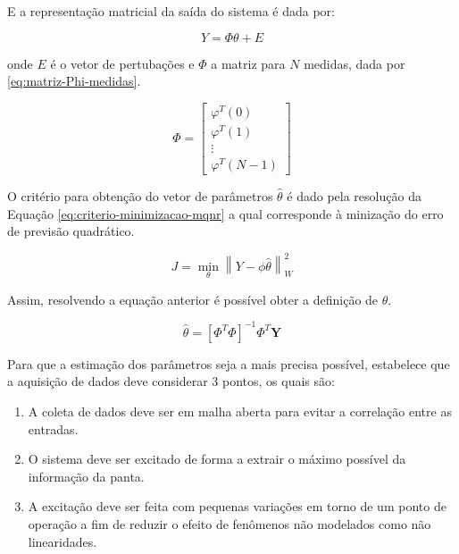 			E a representação matricial da saída do sistema é dada por:

			\begin{equation}
				\label{eq:vetor-y-medidas}
				Y = \Phi \theta + E
			\end{equation}

			\noindent
			onde $E$ é o vetor de pertubações e $\Phi$ a matriz para $N$ medidas, dada por \ref{eq:matriz-Phi-medidas}.

			\begin{equation}
				\label{eq:matriz-Phi-medidas}
				\Phi =  \begin{bmatrix}
							\varphi^T(0) \\
							\varphi^T(1) \\
							\vdots \\
							\varphi^T(N-1)
						\end{bmatrix}
			\end{equation}
			
			O critério para obtenção do vetor de parâmetros $\hat{\theta}$ é dado pela resolução da Equação \ref{eq:criterio-minimizacao-mqnr} a qual corresponde à minização do erro de previsão quadrático.

			\begin{equation}
				\label{eq:criterio-minimizacao-mqnr}
				J = \min_{\theta} \left\| Y - \phi \hat{\theta} \right\|_W^2
			\end{equation}

			Assim, resolvendo a equação anterior é possível obter a definição de $\hat{\theta}$.

			\begin{equation}
				\label{eq:estimador-mqnr}
				\hat{\theta} = [\Phi^T \Phi]^{-1} \Phi^T \mathbf{Y}
			\end{equation}

			Para que a estimação dos parâmetros seja a mais precisa possível,  estabelece que a aquisição de dados deve considerar 3 pontos, os quais são:

			\begin{enumerate}
				\item A coleta de dados deve ser em malha aberta para evitar a correlação entre as entradas.
				\item O sistema deve ser excitado de forma a extrair o máximo possível da informação da panta.
				\item A excitação deve ser feita com pequenas variações em torno de um ponto de operação a fim de reduzir o efeito de fenômenos não modelados como não linearidades.
			\end{enumerate}


